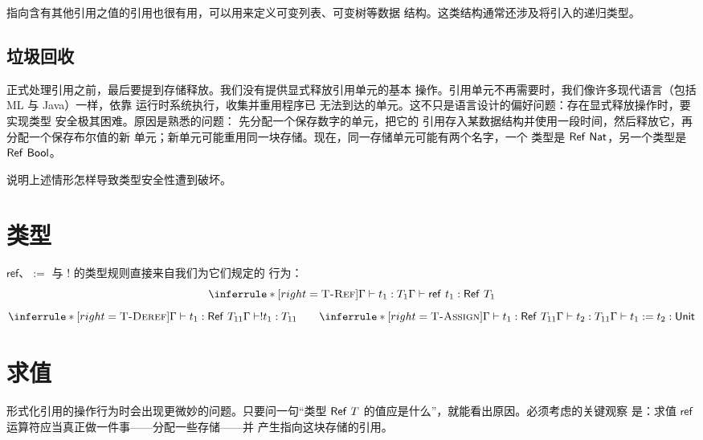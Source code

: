 指向含有其他引用之值的引用也很有用，可以用来定义可变列表、可变树等数据
结构。这类结构通常还涉及将引入的递归类型。

\subsection*{垃圾回收}

正式处理引用之前，最后要提到存储释放。我们没有提供显式释放引用单元的基本
操作。引用单元不再需要时，我们像许多现代语言（包括 ML 与 Java）一样，依靠
运行时系统执行，收集并重用程序已
无法到达的单元。这不只是语言设计的偏好问题：存在显式释放操作时，要实现类型
安全极其困难。原因是熟悉的问题：
先分配一个保存数字的单元，把它的
引用存入某数据结构并使用一段时间，然后释放它，再分配一个保存布尔值的新
单元；新单元可能重用同一块存储。现在，同一存储单元可能有两个名字，一个
类型是 \(\tapltype{Ref}\ \tapltype{Nat}\)，另一个类型是
\(\mathsf{Ref}\ \mathsf{Bool}\)。

\begin{exercise}[\(\star\star\)]
\label{ex:13.1.3}
说明上述情形怎样导致类型安全性遭到破坏。
\end{exercise}

\section{类型}
\label{sec:13.2}

\(\mathsf{ref}\)、\(:=\) 与 \(!\) 的类型规则直接来自我们为它们规定的
行为：
\[
\inferrule*[right=\textsc{T-Ref}]
 {\Gamma\vdash t_1:T_1}
 {\Gamma\vdash\mathsf{ref}\ t_1:\tapltype{Ref}\ T_1}
\]
\[
\inferrule*[right=\textsc{T-Deref}]
 {\Gamma\vdash t_1:\tapltype{Ref}\ T_{11}}
 {\Gamma\vdash!t_1:T_{11}}
\qquad
\inferrule*[right=\textsc{T-Assign}]
 {\Gamma\vdash t_1:\tapltype{Ref}\ T_{11}\\
  \Gamma\vdash t_2:T_{11}}
 {\Gamma\vdash t_1:=t_2:\tapltype{Unit}}
\]

\section{求值}
\label{sec:13.3}

形式化引用的操作行为时会出现更微妙的问题。只要问一句“类型
\(\mathsf{Ref}\ T\) 的值应是什么”，就能看出原因。必须考虑的关键观察
是：求值 \(\mathsf{ref}\) 运算符应当真正做一件事——分配一些存储——并
产生指向这块存储的引用。

